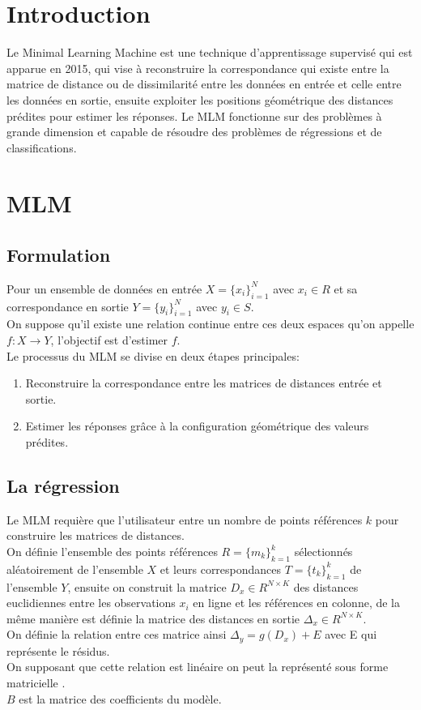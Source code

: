 \documentclass[12pt,a4paper]{report}
\begin{document}
\chapter{Introduction}
\par Le Minimal Learning Machine est une technique d'apprentissage supervisé qui est apparue en 2015, qui vise à reconstruire la correspondance qui existe entre la matrice de distance ou de dissimilarité entre les données en entrée et celle entre les données en sortie, ensuite exploiter les positions géométrique des distances prédites pour estimer les réponses. Le MLM fonctionne sur des problèmes à grande dimension et capable de résoudre des problèmes de régressions et de classifications.

\chapter{MLM}
\section{Formulation}
\par Pour un ensemble de données en entrée $X = \{x_i\}_{i=1}^{N}$ avec
$x_i \in R$ et sa correspondance en sortie $Y = \{y_i\}_{i=1}^{N}$ avec $y_i \in S$.\\
On suppose qu'il existe une relation continue entre ces deux espaces qu'on appelle $f: X \rightarrow Y$, l'objectif est d'estimer $f$.\\
Le processus du MLM se divise en deux étapes principales:
\begin{enumerate}
\item Reconstruire la correspondance entre les matrices de distances entrée et sortie.
\item Estimer les réponses gr\^ace à la configuration géométrique des valeurs prédites. 
\end{enumerate}
\section{La régression}
\par Le MLM requière que l'utilisateur entre un nombre de points références $k$ pour construire les matrices de distances.\\
On définie l'ensemble des points références $R=\{m_k\}_{k=1}^k$ sélectionnés aléatoirement de l'ensemble $X$ et leurs correspondances $T =\{t_k\}_{k=1}^k$ de l'ensemble $Y$, ensuite on construit la matrice $D_x \in R^{N \times K}$ des distances euclidiennes entre les observations $x_i$ en ligne et les références  en colonne, de la même manière est définie la matrice des distances en sortie $\Delta_x \in R^{N \times K}$.\\
On définie la relation entre  ces matrice ainsi $\Delta_y = g(D_x) + E$ avec E qui représente le résidus.\\
On supposant que cette relation est linéaire on peut la représenté sous forme matricielle .\\$B$ est la matrice des coefficients du modèle.\\
\end{document}
